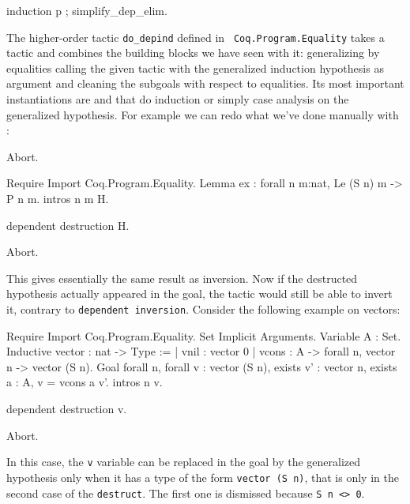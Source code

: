 \begin{coq_example}
induction p ; simplify_dep_elim.
\end{coq_example}

The higher-order tactic {\tt do\_depind} defined in {\tt
  Coq.Program.Equality} takes a tactic and combines the
building blocks we have seen with it: generalizing by equalities
calling the given tactic with the
generalized induction hypothesis as argument and cleaning the subgoals
with respect to equalities. Its most important instantiations are
\depind and \depdestr that do induction or simply case analysis on the
generalized hypothesis. For example we can redo what we've done manually
with \depdestr:

\begin{coq_eval}
Abort.
\end{coq_eval}
\begin{coq_example*}
Require Import Coq.Program.Equality.
Lemma ex : forall n m:nat, Le (S n) m -> P n m.
intros n m H.
\end{coq_example*}
\begin{coq_example}
dependent destruction H.
\end{coq_example}
\begin{coq_eval}
Abort.
\end{coq_eval}

This gives essentially the same result as inversion. Now if the
destructed hypothesis actually appeared in the goal, the tactic would
still be able to invert it, contrary to {\tt dependent
 inversion}. Consider the following example on vectors:

\begin{coq_example*}
Require Import Coq.Program.Equality.
Set Implicit Arguments.
Variable A : Set.
Inductive vector : nat -> Type := 
| vnil : vector 0 
| vcons : A -> forall n, vector n -> vector (S n).
Goal forall n, forall v : vector (S n), 
  exists v' : vector n, exists a : A, v = vcons a v'.
  intros n v.
\end{coq_example*}
\begin{coq_example}
  dependent destruction v.
\end{coq_example}
\begin{coq_eval}
Abort.
\end{coq_eval}

In this case, the {\tt v} variable can be replaced in the goal by the
generalized hypothesis only when it has a type of the form {\tt vector
 (S n)}, that is only in the second case of the {\tt destruct}. The
first one is dismissed because {\tt S n <> 0}.

